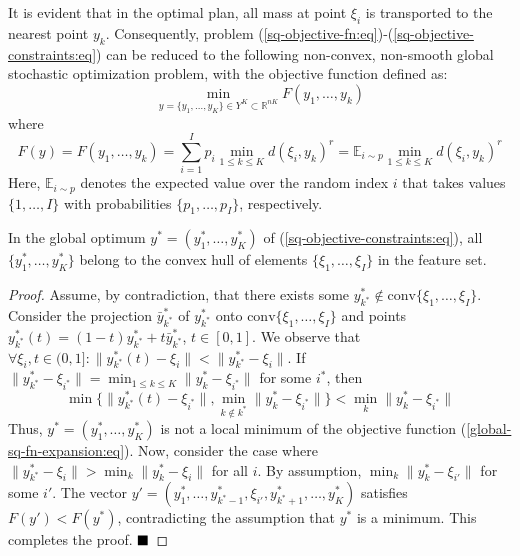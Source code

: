 It is evident that in the optimal plan, all mass at point $\xi_i$ is transported to the nearest point $y_k$. Consequently, problem (\ref{sq-objective-fn:eq})-(\ref{sq-objective-constraints:eq}) can be reduced to the following non-convex, non-smooth global stochastic optimization problem, with the objective function defined as:
\begin{equation}
    \label{global-sq-objective-fn:eq}
        \min_{y = \{ y_1, \ldots, y_K \} \in Y^K \subset \mathbb{R}^{nK}} F(y_1, \ldots, y_k)
\end{equation}
\noindent where
\begin{equation}
    \label{global-sq-fn-expansion:eq}
        F(y) = F(y_1, \ldots, y_k) = \sum_{i=1}^I p_i \min_{1 \leq k \leq K} d(\xi_i, y_k)^r = \mathbb{E}_{i \sim p} \min_{1 \leq k \leq K} d(\xi_i, y_k)^r
\end{equation}
Here, $\mathbb{E}_{i \sim p}$ denotes the expected value over the random index $i$ that takes values $\{1, \ldots, I\}$ with probabilities $\{p_1, \ldots, p_I\}$, respectively.
\begin{lemma}
    \label{Lemma 1} In the global optimum $y^* = (y_1^*, \ldots, y_K^*)$ of (\ref{sq-objective-constraints:eq}), all $\{y_1^*, \ldots, y_K^*\}$ belong to the convex hull of elements $\{\xi_1, \ldots, \xi_I\}$ in the feature set.
\end{lemma}
\begin{proof}
    Assume, by contradiction, that there exists some $y_{k^*}^* \notin \text{conv}\{\xi_1, \ldots, \xi_I\}$. Consider the projection $\bar{y}_{k^*}^*$ of $y_{k^*}^*$ onto $\text{conv}\{\xi_1, \ldots, \xi_I\}$ and points $y_{k^*}^*(t) = (1 - t)y_{k^*}^* + t\bar{y}_{k^*}^*$, $t \in [0, 1]$. We observe that $\forall \xi_i, t \in (0, 1]: \|y_{k^*}^*(t) - \xi_i\| < \|y_{k^*}^* - \xi_i\|$. If $\|y_{k^*}^* - \xi_{i^*}\| = \min_{1 \leq k \leq K} \|y_k^* - \xi_{i^*}\|$ for some $i^*$, then
    \begin{equation}
        \min\{\| y_{k^*}^*(t) - \xi_{i^*} \|, \min_{k \notin k^*} \| y_k^* - \xi_{i^*} \|\} < \min_k \| y_k^* - \xi_{i^*} \|
    \end{equation}
    \noindent Thus, $y^* = (y_1^*, \ldots, y_K^*)$ is not a local minimum of the objective function (\ref{global-sq-fn-expansion:eq}). Now, consider the case where $ \| y_{k^*}^* - \xi_i \| > \min_k \| y_k^* - \xi_i \|$ for all $i$. By assumption, $\min_k \| y_k^* - \xi_{i'} \|$ for some $i'$. The vector $y' = (y_1^*, \ldots, y_{k^* - 1}^*, \xi_{i'}, y_{k^* + 1}^*, \ldots, y_K^*)$ satisfies $F(y') < F(y^*)$, contradicting the assumption that $y^*$ is a minimum. This completes the proof. $ \qed $
\end{proof}

